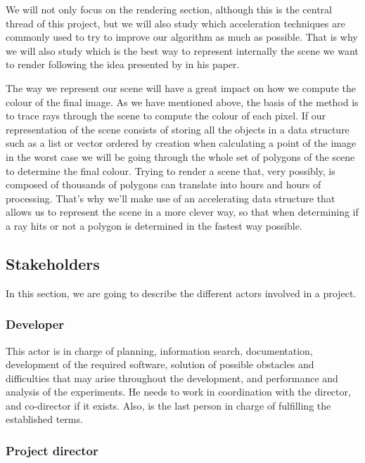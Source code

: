 \documentclass[titlepage,12pt]{report}
\begin{document}
We will not only focus on the rendering section, although this is the central thread of this project, but we will also study which acceleration techniques are commonly used to try to improve our algorithm as much as possible. That is why we will also study which is the best way to represent internally the scene we want to render following the idea presented by \citep{Karras2012} in his paper.

The way we represent our scene will have a great impact on how we compute the colour of the final image. As we have mentioned above, the basis of the method is to trace rays through the scene to compute the colour of each pixel. If our representation of the scene consists of storing all the objects in a data structure such as a list or vector ordered by creation when calculating a point of the image in the worst case we will be going through the whole set of polygons of the scene to determine the final colour. Trying to render a scene that, very possibly, is composed of thousands of polygons can translate into hours and hours of processing. That's why we'll make use of an accelerating data structure that allows us to represent the scene in a more clever way, so that when determining if a ray hits or not a polygon is determined in the fastest way possible.

\subsection{Stakeholders}

In this section, we are going to describe the different actors involved in a project.

\subsubsection{Developer}

This actor is in charge of planning, information search, documentation, development of the required software, solution of possible obstacles and difficulties that may arise throughout the development, and performance and analysis of the experiments. He needs to work in coordination with the director, and co-director if it exists. Also, is the last person in charge of fulfilling the established terms.

\subsubsection{Project director}
\end{document}
